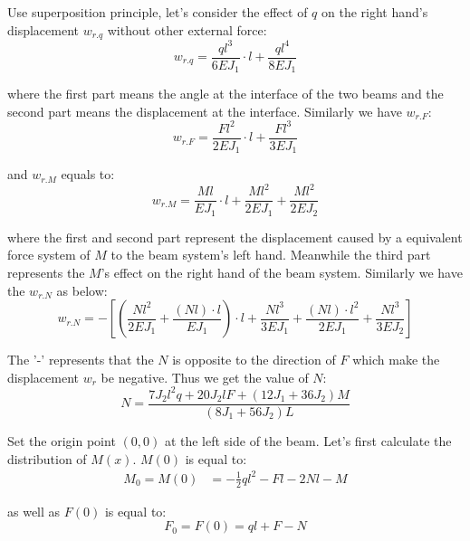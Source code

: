 Use superposition principle, let's consider the effect of $q$ on the right hand's displacement $w_{r.q}$ without other external force:
\begin{equation}
    w_{r.q}=
    \frac{q l^3}{6EJ_1}\cdot l+
    \frac{q l^4}{8EJ_1}
\end{equation}

where the first part means the angle at the interface of the two beams and the second part means the displacement at the interface. 
Similarly we have $w_{r.F}$:
\begin{equation}
    w_{r.F} = \frac{Fl^2}{2EJ_1}\cdot l + \frac{Fl^3}{3EJ_1}
\end{equation}

and $w_{r.M}$ equals to:
\begin{equation}
    w_{r.M}= 
    \frac{Ml}{EJ_1}\cdot l + \frac{Ml^2}{2EJ_1} + \frac{Ml^2}{2EJ_2}
\end{equation}

where the first and second part represent the displacement caused by a equivalent force system of $M$ to the beam system's left hand. 
Meanwhile the third part represents the $M$'s effect on the right hand of the beam system. 
Similarly we have the $w_{r.N}$ as below:
\begin{equation}
    w_{r.N}=-
    \left[
        \left(
            \frac{Nl^2}{2EJ_1}+
            \frac{(Nl)\cdot l}{EJ_1}
        \right)\cdot l
        +
        \frac{Nl^3}{3EJ_1}
        +
        \frac{(Nl)\cdot l^2}{2EJ_1}
        +
        \frac{Nl^3}{3EJ_2}
    \right]
\end{equation}

The '-' represents that the $N$ is opposite to the direction of $F$ which make the displacement $w_r$ be negative. 
Thus we get the value of $N$:
\begin{equation}
    N=
    \frac{
        7J_2 l^2 q + 
        20J_2 l F +
        (12 J_1+ 36J_2) M
    }{(8J_1 + 56J_2)L}
\end{equation}

Set the origin point $(0, 0)$ at the left side of the beam. 
Let's first calculate the distribution of $M(x)$. 
$M(0)$ is equal to:
\begin{equation}
    \begin{aligned}
        M_0=M(0)&=
        -\frac{1}{2}ql^2-
        Fl-
        2Nl-
        M
    \end{aligned}
\end{equation}

as well as $F(0)$ is equal to:
\begin{equation}
    F_0=F(0)=
    ql+F - N
\end{equation}


